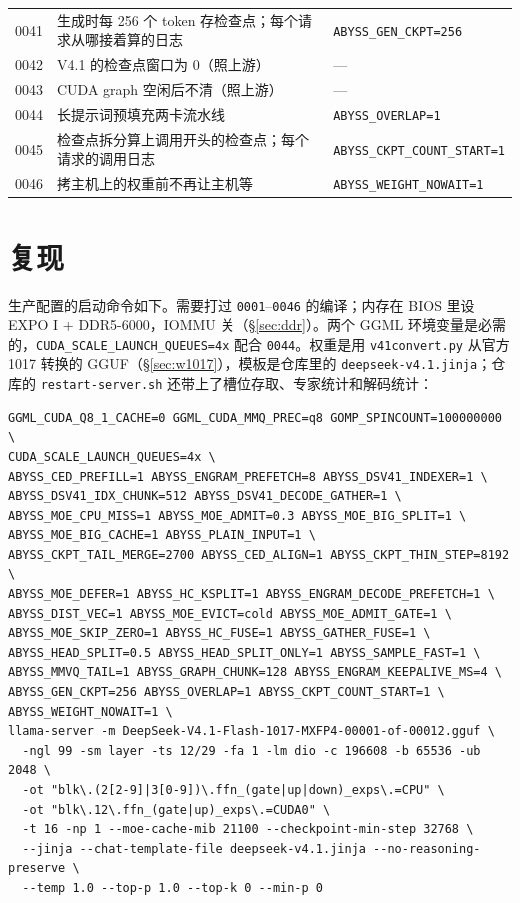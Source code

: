 \documentclass[11pt,a4paper]{article}
\newcommand{\code}[1]{\texttt{#1}}
\begin{document}
\begin{table}[h]
\begin{tabularx}{\textwidth}{@{}l X l@{}}
    0041 & 生成时每 256 个 token 存检查点；每个请求从哪接着算的日志 & \code{ABYSS\_GEN\_CKPT=256} \\
    0042 & V4.1 的检查点窗口为 0（照上游） & — \\
    0043 & CUDA graph 空闲后不清（照上游） & — \\
    0044 & 长提示词预填充两卡流水线 & \code{ABYSS\_OVERLAP=1} \\
    0045 & 检查点拆分算上调用开头的检查点；每个请求的调用日志 & \code{ABYSS\_CKPT\_COUNT\_START=1} \\
    0046 & 拷主机上的权重前不再让主机等 & \code{ABYSS\_WEIGHT\_NOWAIT=1} \\
    \bottomrule
  \end{tabularx}
\end{table}

\section{复现}

生产配置的启动命令如下。需要打过 \code{0001}--\code{0046} 的编译；内存在 BIOS 里设 EXPO I + DDR5-6000，IOMMU 关（\S\ref{sec:ddr}）。两个 GGML 环境变量是必需的，\code{CUDA\_SCALE\_LAUNCH\_QUEUES=4x} 配合 \code{0044}。权重是用 \code{v41convert.py} 从官方 1017 转换的 GGUF（\S\ref{sec:w1017}），模板是仓库里的 \code{deepseek-v4.1.jinja}；仓库的 \code{restart-server.sh} 还带上了槽位存取、专家统计和解码统计：

\begin{small}
\begin{verbatim}
GGML_CUDA_Q8_1_CACHE=0 GGML_CUDA_MMQ_PREC=q8 GOMP_SPINCOUNT=100000000 \
CUDA_SCALE_LAUNCH_QUEUES=4x \
ABYSS_CED_PREFILL=1 ABYSS_ENGRAM_PREFETCH=8 ABYSS_DSV41_INDEXER=1 \
ABYSS_DSV41_IDX_CHUNK=512 ABYSS_DSV41_DECODE_GATHER=1 \
ABYSS_MOE_CPU_MISS=1 ABYSS_MOE_ADMIT=0.3 ABYSS_MOE_BIG_SPLIT=1 \
ABYSS_MOE_BIG_CACHE=1 ABYSS_PLAIN_INPUT=1 \
ABYSS_CKPT_TAIL_MERGE=2700 ABYSS_CED_ALIGN=1 ABYSS_CKPT_THIN_STEP=8192 \
ABYSS_MOE_DEFER=1 ABYSS_HC_KSPLIT=1 ABYSS_ENGRAM_DECODE_PREFETCH=1 \
ABYSS_DIST_VEC=1 ABYSS_MOE_EVICT=cold ABYSS_MOE_ADMIT_GATE=1 \
ABYSS_MOE_SKIP_ZERO=1 ABYSS_HC_FUSE=1 ABYSS_GATHER_FUSE=1 \
ABYSS_HEAD_SPLIT=0.5 ABYSS_HEAD_SPLIT_ONLY=1 ABYSS_SAMPLE_FAST=1 \
ABYSS_MMVQ_TAIL=1 ABYSS_GRAPH_CHUNK=128 ABYSS_ENGRAM_KEEPALIVE_MS=4 \
ABYSS_GEN_CKPT=256 ABYSS_OVERLAP=1 ABYSS_CKPT_COUNT_START=1 \
ABYSS_WEIGHT_NOWAIT=1 \
llama-server -m DeepSeek-V4.1-Flash-1017-MXFP4-00001-of-00012.gguf \
  -ngl 99 -sm layer -ts 12/29 -fa 1 -lm dio -c 196608 -b 65536 -ub 2048 \
  -ot "blk\.(2[2-9]|3[0-9])\.ffn_(gate|up|down)_exps\.=CPU" \
  -ot "blk\.12\.ffn_(gate|up)_exps\.=CUDA0" \
  -t 16 -np 1 --moe-cache-mib 21100 --checkpoint-min-step 32768 \
  --jinja --chat-template-file deepseek-v4.1.jinja --no-reasoning-preserve \
  --temp 1.0 --top-p 1.0 --top-k 0 --min-p 0
\end{verbatim}
\end{small}
\end{document}
